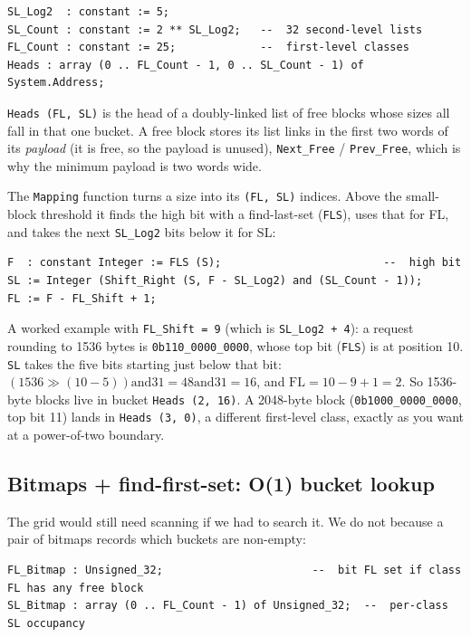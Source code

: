 \begin{lstlisting}
SL_Log2  : constant := 5;
SL_Count : constant := 2 ** SL_Log2;   --  32 second-level lists
FL_Count : constant := 25;             --  first-level classes
Heads : array (0 .. FL_Count - 1, 0 .. SL_Count - 1) of System.Address;
\end{lstlisting}

\texttt{Heads (FL, SL)} is the head of a doubly-linked list of free blocks whose
sizes all fall in that one bucket. A free block stores its list links in the first
two words of its \emph{payload} (it is free, so the payload is unused),
\texttt{Next\_Free} / \texttt{Prev\_Free}, which is why the minimum payload is
two words wide.

The \texttt{Mapping} function turns a size into its \texttt{(FL, SL)} indices.
Above the small-block threshold it finds the high bit with a find-last-set
(\texttt{FLS}), uses that for FL, and takes the next \texttt{SL\_Log2} bits below
it for SL:

\begin{lstlisting}
F  : constant Integer := FLS (S);                         --  high bit
SL := Integer (Shift_Right (S, F - SL_Log2) and (SL_Count - 1));
FL := F - FL_Shift + 1;
\end{lstlisting}

A worked example with \texttt{FL\_Shift = 9} (which is \texttt{SL\_Log2 + 4}): a
request rounding to 1536 bytes is \texttt{0b110\_0000\_0000}, whose top bit
(\texttt{FLS}) is at position 10. \texttt{SL} takes the five bits starting just
below that bit: $(1536 \gg (10-5)) \mathbin{\mathrm{and}} 31 = 48
\mathbin{\mathrm{and}} 31 = 16$, and $\mathrm{FL} = 10-9+1 = 2$. So 1536-byte
blocks live in bucket \texttt{Heads (2, 16)}. A 2048-byte block
(\texttt{0b1000\_0000\_0000}, top bit 11) lands in \texttt{Heads (3, 0)}, a
different first-level class, exactly as you want at a power-of-two boundary.

\subsection{Bitmaps + find-first-set: O(1) bucket lookup}

The grid would still need scanning if we had to search it. We do not because a
pair of bitmaps records which buckets are non-empty:

\begin{lstlisting}
FL_Bitmap : Unsigned_32;                       --  bit FL set if class FL has any free block
SL_Bitmap : array (0 .. FL_Count - 1) of Unsigned_32;  --  per-class SL occupancy
\end{lstlisting}

